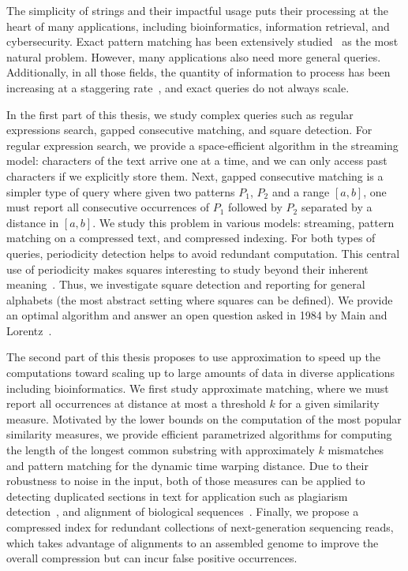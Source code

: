 The simplicity of strings and their impactful usage puts their processing at the heart of many applications, including bioinformatics, information retrieval, and cybersecurity. Exact pattern matching has been extensively studied~\cite{charras2004handbook} as the most natural problem. However, many applications also need more general queries. Additionally, in all those fields, the quantity of information to process has been increasing at a staggering rate~\cite{muir2016real}, and exact queries do not always scale.

In the first part of this thesis, we study complex queries such as regular expressions search, gapped consecutive matching, and square detection. 
For regular expression search, we provide a space-efficient algorithm in the streaming model: characters of the text arrive one at a time, and we can only access past characters if we explicitly store them. 
Next, gapped consecutive matching is a simpler type of query where given two patterns $P_1$, $P_2$ and a range $[a,b]$, one must report all consecutive occurrences of $P_1$ followed by $P_2$ separated by a distance in $[a,b]$. We study this problem in various models: streaming, pattern matching on a compressed text, and compressed indexing.
For both types of queries, periodicity detection helps to avoid redundant computation. This central use of periodicity makes squares interesting to study beyond their inherent meaning~\cite{Kolpakov2003}. Thus, we investigate square detection and reporting for general alphabets (the most abstract setting where squares can be defined). We provide an optimal algorithm and answer an open question asked in 1984 by Main and Lorentz~\cite{Main1984}.

The second part of this thesis proposes to use approximation to speed up the computations toward scaling up to large amounts of data in diverse applications including bioinformatics.
We first study approximate matching, where we must report all occurrences at distance at most a threshold $k$ for a given similarity measure. Motivated by the lower bounds on the computation of the most popular similarity measures, we provide efficient parametrized algorithms for computing the length of the longest common substring with approximately $k$ mismatches and pattern matching for the dynamic time warping distance.
Due to their robustness to noise in the input, both of those measures can be applied to detecting duplicated sections in text for application such as plagiarism detection~\cite{zou2010cluster}, and alignment of biological sequences~\cite{leimeister2014kmacs,loose2016real,han2018accurate}.
Finally, we propose a compressed index for redundant collections of next-generation sequencing reads, which takes advantage of alignments to an assembled genome to improve the overall compression but can incur false positive occurrences.

